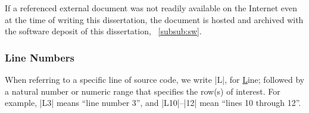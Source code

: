 If a referenced external document was not readily available on the Internet even at the time of writing this dissertation,
the document is hosted and archived with the software deposit of this dissertation, \cf~\autoref{subsub:sw}.

\subsubsection{Line Numbers}
When referring to a specific line of source code,
we write \pr|L|, for \underline{L}ine;
followed by a natural number or numeric range that specifies the row(s) of interest.
For example, \pr|L3| means \enquote{line number 3}, and \pr|L10|--\pr|12| mean \enquote{lines 10 through 12}.
